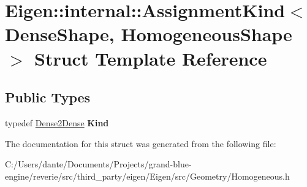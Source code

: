 \hypertarget{struct_eigen_1_1internal_1_1_assignment_kind_3_01_dense_shape_00_01_homogeneous_shape_01_4}{}\section{Eigen\+::internal\+::Assignment\+Kind$<$ Dense\+Shape, Homogeneous\+Shape $>$ Struct Template Reference}
\label{struct_eigen_1_1internal_1_1_assignment_kind_3_01_dense_shape_00_01_homogeneous_shape_01_4}
\subsection*{Public Types}
\begin{DoxyCompactItemize}
\item 
\mbox{\label{struct_eigen_1_1internal_1_1_assignment_kind_3_01_dense_shape_00_01_homogeneous_shape_01_4_af8e25accbdd082697ab50d60a5ff7668}} 
typedef \mbox{\hyperlink{struct_eigen_1_1internal_1_1_dense2_dense}{Dense2\+Dense}} {\bfseries Kind}
\end{DoxyCompactItemize}


The documentation for this struct was generated from the following file\+:\begin{DoxyCompactItemize}
\item 
C\+:/\+Users/dante/\+Documents/\+Projects/grand-\/blue-\/engine/reverie/src/third\+\_\+party/eigen/\+Eigen/src/\+Geometry/Homogeneous.\+h\end{DoxyCompactItemize}
